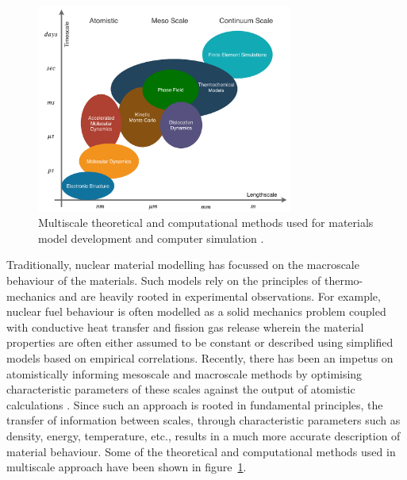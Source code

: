 	\begin{figure}[htbp]
		\centering
		\includegraphics[width=0.75\textwidth]{figures/Multiphysics.pdf}
		\caption{Multiscale theoretical and computational methods used for materials model development and computer simulation \cite{STAN200920}.}
		\label{fig:multiphys}
	\end{figure}

	Traditionally, nuclear material modelling has focussed on the macroscale behaviour of the materials. Such models rely on the principles of thermo-mechanics and are heavily rooted in experimental observations. For example, nuclear fuel behaviour is often modelled as a solid mechanics problem coupled with conductive heat transfer and fission gas release wherein the material properties are often either assumed to be constant or described using simplified models based on empirical correlations. Recently, there has been an impetus on atomistically informing mesoscale  and macroscale methods by optimising characteristic parameters of these scales against the output of atomistic calculations \cite{STAN200920}. Since such an approach is rooted in fundamental principles, the transfer of information between scales, through characteristic parameters such as density, energy, temperature, etc., results in a much more accurate description of material behaviour. Some of the theoretical and computational methods used in multiscale approach have been shown in figure~\ref{fig:multiphys}.


